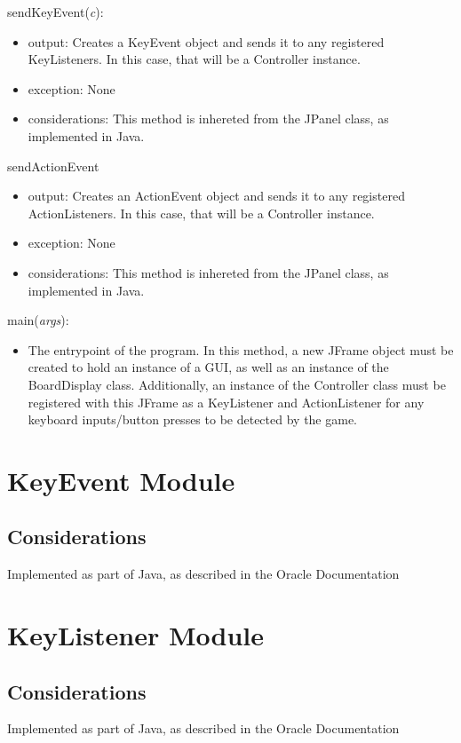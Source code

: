 \documentclass{article}
\begin{document}
			\noindent sendKeyEvent(\textit{c}):
			\begin{itemize}
				\item output: Creates a KeyEvent object and sends it to any registered KeyListeners. In this case, that will be a Controller instance.
				\item exception: None
				\item considerations: This method is inhereted from the JPanel class, as implemented in Java.
			\end{itemize}

			\noindent sendActionEvent
			\begin{itemize}
				\item output: Creates an ActionEvent object and sends it to any registered ActionListeners. In this case, that will be a Controller instance.
				\item exception: None
				\item considerations: This method is inhereted from the JPanel class, as implemented in Java.
			\end{itemize}

			\noindent main(\textit{args}):
			\begin{itemize}
				\item The entrypoint of the program. In this method, a new JFrame object must be created to hold an instance of a GUI, as well as an instance of the BoardDisplay class. Additionally, an instance of the Controller class must be registered with this JFrame as a KeyListener and ActionListener for any keyboard inputs/button presses to be detected by the game.
			\end{itemize}

\newpage

\section*{KeyEvent Module}

	\subsection*{Considerations}
		Implemented as part of Java, as described in the Oracle Documentation

\section*{KeyListener Module}

	\subsection*{Considerations}
		Implemented as part of Java, as described in the Oracle Documentation
\end{document}
